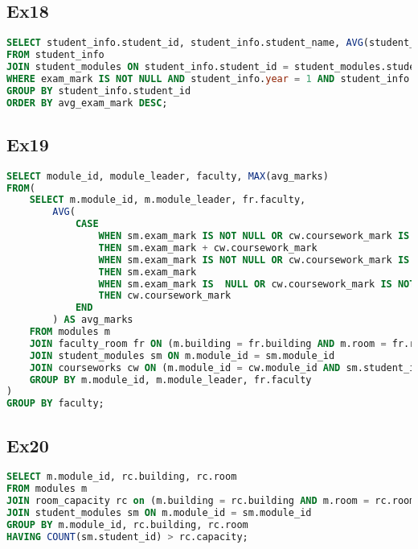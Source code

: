 \documentclass{article}
\begin{document}
\subsection{Ex18}
\begin{lstlisting}[language=SQL]
SELECT student_info.student_id, student_info.student_name, AVG(student_modules.exam_mark) AS avg_exam_mark
FROM student_info
JOIN student_modules ON student_info.student_id = student_modules.student_id
WHERE exam_mark IS NOT NULL AND student_info.year = 1 AND student_info.programme = 'Computer Science'
GROUP BY student_info.student_id
ORDER BY avg_exam_mark DESC;
\end{lstlisting}
\subsection{Ex19}
\begin{lstlisting}[language=SQL]
SELECT module_id, module_leader, faculty, MAX(avg_marks)
FROM(
    SELECT m.module_id, m.module_leader, fr.faculty, 
        AVG(
            CASE 
                WHEN sm.exam_mark IS NOT NULL OR cw.coursework_mark IS NOT NULL 
                THEN sm.exam_mark + cw.coursework_mark 
                WHEN sm.exam_mark IS NOT NULL OR cw.coursework_mark IS NULL
                THEN sm.exam_mark
                WHEN sm.exam_mark IS  NULL OR cw.coursework_mark IS NOT NULL
                THEN cw.coursework_mark
            END
        ) AS avg_marks
    FROM modules m
    JOIN faculty_room fr ON (m.building = fr.building AND m.room = fr.room)
    JOIN student_modules sm ON m.module_id = sm.module_id
    JOIN courseworks cw ON (m.module_id = cw.module_id AND sm.student_id = cw.student_id)
    GROUP BY m.module_id, m.module_leader, fr.faculty
)
GROUP BY faculty;
\end{lstlisting}
\subsection{Ex20}
\begin{lstlisting}[language=SQL]
SELECT m.module_id, rc.building, rc.room
FROM modules m
JOIN room_capacity rc on (m.building = rc.building AND m.room = rc.room)
JOIN student_modules sm ON m.module_id = sm.module_id
GROUP BY m.module_id, rc.building, rc.room
HAVING COUNT(sm.student_id) > rc.capacity;
\end{lstlisting}
\end{document}
